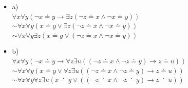 \documentclass[a4paper]{scrartcl}
\begin{document}
    \begin{itemize}
        \item a)\\
            $\forall x \forall y (\neg x \doteq y \rightarrow \exists z (\neg z \doteq x \land \neg x \doteq y))$\\
            $\sim \forall x \forall y (x \doteq y \lor \exists z (\neg z \doteq x \land \neg x \doteq y))$\\
            $\sim \forall x \forall y \exists z (x \doteq y \lor (\neg z \doteq x \land \neg x \doteq y))$\\

        \item b)\\
            $\forall x \forall y (\neg x \doteq y \rightarrow \forall z \exists u ((\neg z \doteq x \land \neg z \doteq y) \rightarrow z \doteq u))$\\
            $\sim \forall x \forall y (x \doteq y \lor \forall z \exists u ((\neg z \doteq x \land \neg z \doteq y) \rightarrow z \doteq u))$\\
            $\sim \forall x \forall y \forall z \exists u (x \doteq y \lor ((\neg z \doteq x \land \neg z \doteq y) \rightarrow z \doteq u))$\\


\end{itemize}
\end{document}
